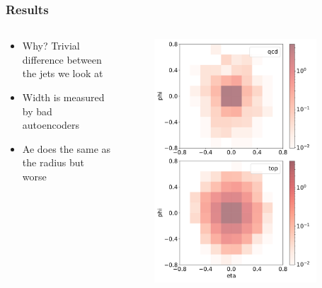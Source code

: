 \documentclass[hyperref={pdfpagelabels=false}]{beamer}
\begin{document}
\begin{frame}[label=Results]
\frametitle{Results}
\begin{columns}[c] %
\begin{column}{0.48\textwidth}%
\begin{itemize}

    \item Why? Trivial difference between the jets we look at

    \item Width is measured by bad autoencoders

    \item Ae does the same as the radius but worse


\end{itemize}
\end{column}%
\hfill%
\begin{column}{0.48\textwidth}%
\begin{figure}[H] 
  \centering
\includegraphics[width=0.90\textwidth]{../imgs/meanangle3}
\label{fig:meanangle3}
  \end{figure}


\end{column}%
\hfill%
\end{columns}

\end{frame}
\end{document}

